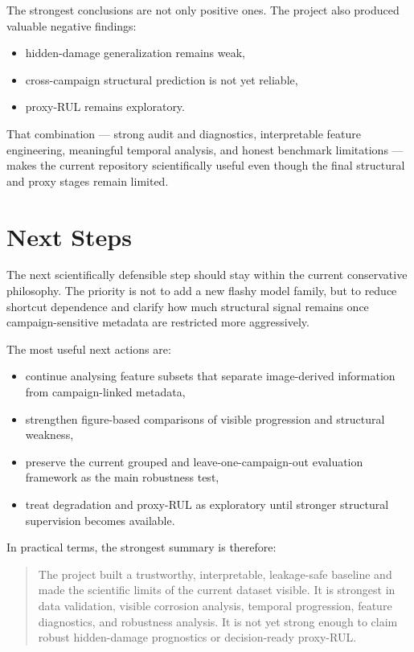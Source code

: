 \documentclass[10pt,a4paper,twocolumn]{article}
\begin{document}
The strongest conclusions are not only positive ones. The project also produced valuable negative findings:

\begin{itemize}
    \item hidden-damage generalization remains weak,
    \item cross-campaign structural prediction is not yet reliable,
    \item proxy-RUL remains exploratory.
\end{itemize}

That combination --- strong audit and diagnostics, interpretable feature engineering, meaningful temporal analysis, and honest benchmark limitations --- makes the current repository scientifically useful even though the final structural and proxy stages remain limited.

\section{Next Steps}

The next scientifically defensible step should stay within the current conservative philosophy. The priority is not to add a new flashy model family, but to reduce shortcut dependence and clarify how much structural signal remains once campaign-sensitive metadata are restricted more aggressively.

The most useful next actions are:

\begin{itemize}
    \item continue analysing feature subsets that separate image-derived information from campaign-linked metadata,
    \item strengthen figure-based comparisons of visible progression and structural weakness,
    \item preserve the current grouped and leave-one-campaign-out evaluation framework as the main robustness test,
    \item treat degradation and proxy-RUL as exploratory until stronger structural supervision becomes available.
\end{itemize}

In practical terms, the strongest summary is therefore:

\begin{quote}
The project built a trustworthy, interpretable, leakage-safe baseline and made the scientific limits of the current dataset visible. It is strongest in data validation, visible corrosion analysis, temporal progression, feature diagnostics, and robustness analysis. It is not yet strong enough to claim robust hidden-damage prognostics or decision-ready proxy-RUL.
\end{quote}
\end{document}
